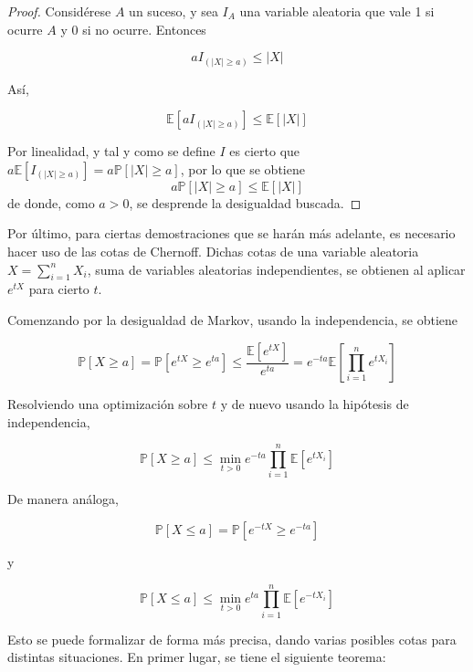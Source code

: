 \begin{proof}
Considérese $A$ un suceso, y sea $I_A$ una variable aleatoria que vale 1 si ocurre $A$ y 0 si no ocurre. Entonces

$$aI_{(|X|\geq a)}\leq|X|$$

Así,

$$\mathbb{E}[aI_{(|X|\geq a)}]\leq \mathbb{E}[|X|]$$

Por linealidad, y tal y como se define $I$ es cierto que $a\mathbb{E}[I_{(|X|\geq a)}]=a \mathbb{P}[|X| \geq a] $, por lo que se obtiene
$$a\mathbb{P}[|X| \geq a] \leq \mathbb{E}[|X|]$$ 
de donde, como $a>0$, se desprende la desigualdad buscada.

\end{proof}

Por último, para ciertas demostraciones que se harán más adelante, es necesario hacer uso de las cotas de Chernoff. Dichas cotas de una variable aleatoria $X=\sum_{i=1}^n X_i$, suma de variables aleatorias independientes, se obtienen al aplicar $e^{tX}$ para cierto $t$.

Comenzando por la desigualdad de Markov, usando la independencia, se obtiene

$$\mathbb{P}[X \geq a] = \mathbb{P}[e^{tX} \geq e^{ta}] \leq \frac{\mathbb{E}[e^{tX}]}{e^{ta}} = e^{-ta} \mathbb{E} \left[ \prod_{i=1}^n e^{tX_i} \right]$$

Resolviendo una optimización sobre $t$ y de nuevo usando la hipótesis de independencia,

\begin{equation} \label{optimiza}
\mathbb{P}[X \geq a] \leq \min_{t>0} e^{-ta} \prod_{i=1}^n \mathbb{E}[e^{tX_i}]
\end{equation}

De manera análoga,

$$\mathbb{P}[X \leq a] = \mathbb{P}[e^{-tX} \geq e^{-ta}]$$

y

$$\mathbb{P}[X \leq a] \leq \min_{t>0} e^{ta} \prod_{i=1}^n \mathbb{E}[e^{-tX_i}]$$

Esto se puede formalizar de forma más precisa, dando varias posibles cotas para distintas situaciones. En primer lugar, se tiene el siguiente teorema:

